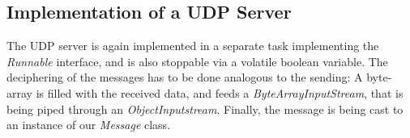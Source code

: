 \subsection{Implementation of a UDP Server}
The UDP server is again implemented in a separate task implementing the \textit{Runnable} interface, and is also stoppable via a volatile boolean variable. The deciphering of the messages has to be done analogous to the sending: A byte-array is filled with the received data, and feeds a \textit{ByteArrayInputStream}, that is being piped through an \textit{ObjectInputstream}. Finally, the message is being cast to an instance of our \textit{Message} class. 